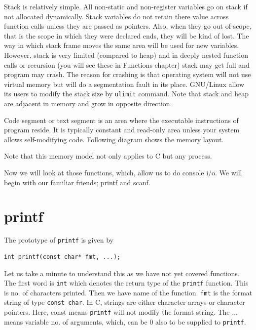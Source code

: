 Stack is relatively simple. All non-static and non-register variables go on
stack if not allocated dynamically. Stack variables do not retain there value
across function calls unless
they are passed as pointers. Also, when they go out of
scope, that is the scope in which they were declared ends, they will be kind of
lost. The way in which stack frame moves the same area will be used for new
variables. However, stack is very limited (compared to heap) and in deeply
nested function calls or recursion (you will see these in Functions chapter)
stack may get full and program may crash. The reason for crashing is that
operating system will not use virtual memory but will do a segmentation fault
in its place. GNU/Linux allow its users to modify the stack size by 
\texttt{ulimit} command. Note that stack and heap are adjacent in memory and 
grow in opposite direction.

Code segment or text segment is an area where the executable instructions of
program reside. It is typically constant and read-only area unless your system
allows self-modifying code. Following diagram shows the memory layout.

Note that this memory model not only applies to C but any process.

Now we will look at those functions, which, allow us to do console i/o. We will
begin with our familiar friends; printf and scanf.

\section{printf}
The prototype of \texttt{printf} is given by

\begin{Verbatim}[frame=single]
int printf(const char* fmt, ...);
\end{Verbatim}

Let us take a minute to understand this as we have not yet covered
functions. The first word is \texttt{int} which denotes the return type of the
\texttt{printf} function. This is no. of characters printed. Then we have name
of the function. \texttt{fmt} is the format string of type \texttt{const
 char}. In C, strings are either character arrays or character pointers. Here,
const means \texttt{printf} will not modify the format string. The ... means
variable no. of arguments, which, can be 0 also to be supplied to
\texttt{printf}.

